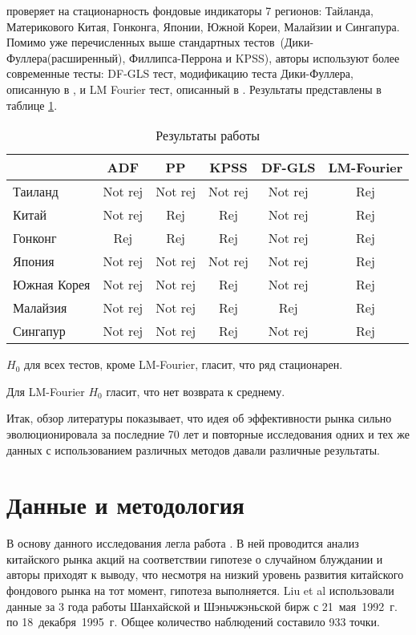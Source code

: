 \documentclass[a4paper,12pt]{article}
\begin{document}
\cite{Wang2015} проверяет на стационарность фондовые индикаторы 7 регионов: Тайланда, Материкового Китая, Гонконга, Японии, Южной Кореи, Малайзии и Сингапура. Помимо уже перечисленных выше стандартных тестов~(Дики-Фуллера(расширенный), Филлипса-Перрона и KPSS), авторы используют более современные тесты: DF-GLS тест, модификацию теста Дики-Фуллера, описанную в \cite{Elliot1996}, и LM Fourier тест, описанный в \cite{Enders2012}. Результаты представлены в таблице \ref{tab:wang}.

\begin{table}
\centering
\caption{Результаты работы \cite{Wang2015}}
\label{tab:wang}
\begin{tabular}{|l|c|c|c|c|c|}
\hline
 & ADF & PP & KPSS & DF-GLS & LM-Fourier \\ \hline
Таиланд & Not rej & Not rej & Not rej & Not rej & Rej \\ \hline
Китай & Not rej & Rej & Rej & Not rej & Rej \\ \hline
Гонконг & Rej & Rej & Rej & Not rej & Rej \\ \hline
Япония & Not rej & Not rej & Not rej & Not rej & Rej \\ \hline
Южная Корея & Not rej & Not rej & Rej & Not rej & Rej \\ \hline
Малайзия & Not rej & Not rej & Rej & Rej & Rej \\ \hline
Сингапур & Not rej & Not rej & Rej & Not rej & Rej \\ \hline
\end{tabular}

{\raggedright \par $H_0$ для всех тестов, кроме LM-Fourier, гласит, что ряд стационарен.}

{\raggedright \par Для LM-Fourier $H_0$ гласит, что нет возврата к среднему.}
\end{table}

Итак, обзор литературы показывает, что идея об эффективности рынка сильно эволюционировала за последние 70 лет и повторные исследования одних и тех же данных с использованием различных методов давали различные результаты.

\newpage
\section{Данные и методология}\label{sec:meth}

В основу данного исследования легла работа \cite{Liu1997}. В ней проводится анализ китайского рынка акций на соответствии гипотезе о случайном блуждании и авторы приходят к выводу, что несмотря на низкий уровень развития китайского фондового рынка на тот момент, гипотеза выполняется. Liu et al использовали данные за 3 года работы Шанхайской и Шэньчжэньской бирж с 21~мая~1992~г. по 18~декабря~1995~г. Общее количество наблюдений составило 933 точки.
\end{document}
